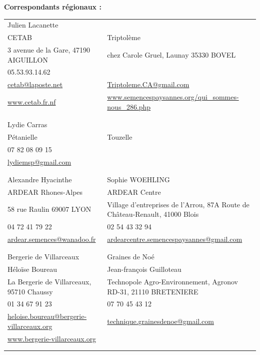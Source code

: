 \vfill

\newpage

\noindent\textbf{\textsf{Correspondants régionaux :}} \\

\begin{longtable}{p{}p{}}

Julien Lacanette 									& \\
CETAB 												& Triptolème \\
3 avenue de la Gare, 47190 AIGUILLON 				& chez Carole Gruel, Launay 35330 BOVEL \\
05.53.93.14.62										& \\
\href{mailto:cetab@laposte.net}{cetab@laposte.net} 	& \href{Triptoleme.CA@gmail.com}{Triptoleme.CA@gmail.com} \\
\href{www.cetab.fr.nf}{www.cetab.fr.nf} 			& \href{ www.semencespaysannes.org/qui_sommes-nous_286.php}{www.semencespaysannes.org/qui\_sommes-nous\_286.php}\\
& \\
& \\

Lydie Carras & \\
Pétanielle & Touzelle \\
07 82 08 09 15 & \\
\href{mailto:lydiemsp@gmail.com}{lydiemsp@gmail.com} & \\
& \\
& \\

Alexandre Hyacinthe  													& Sophie WOEHLING \\ 
ARDEAR Rhones-Alpes 													& ARDEAR Centre \\
58 rue Raulin 69007 LYON 												& Village d'entreprises de l'Arrou, 87A Route de Château-Renault, 41000 Blois \\
04 72 41 79 22 															& 02 54 43 32 94 \\
\href{mailto:ardear.semences@wanadoo.fr}{ardear.semences@wanadoo.fr}	& \href{mailto:ardearcentre.semencespaysannes@gmail.com}{ardearcentre.semencespaysannes@gmail.com} \\
& \\
& \\

Bergerie de Villarceaux 																			& Graines de Noé \\
Héloïse Boureau 																					& Jean-françois Guilloteau \\
La Bergerie de Villarceaux, 95710 Chaussy 															& Technopole Agro-Environnement, Agronov RD-31, 21110 BRETENIERE \\
01 34 67 91 23																						& 07 70 45 43 12 \\
\href{mailto:heloise.boureau@bergerie-villarceaux.org}{heloise.boureau@bergerie-villarceaux.org} 	& \href{technique.grainesdenoe@gmail.com}{technique.grainesdenoe@gmail.com} \\
\href{www.bergerie-villarceaux.org}{www.bergerie-villarceaux.org} \\
& \\
& \\


\end{longtable}
